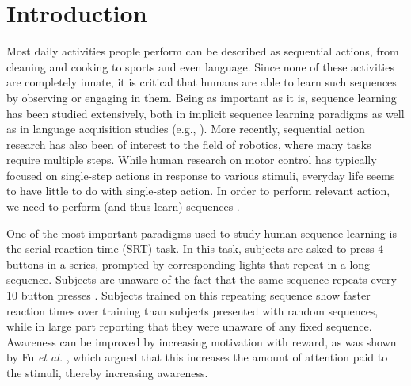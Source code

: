 \documentclass[conference]{IEEEtran}
\begin{document}

\section{Introduction}

Most daily activities people perform can be described as sequential actions, from cleaning and cooking to sports and even language. Since none of these activities are completely innate, it is critical that humans are able to learn such sequences by observing or engaging in them. Being as important as it is, sequence learning has been studied extensively, both in implicit sequence learning paradigms \cite{Nissen:1987,Cleeremans:1991,Stadler:1992,Boyer:2005} as well as in language acquisition studies (e.g., \cite{Saffran:1996}). More recently, sequential action research has also been of interest to the field of robotics, where many tasks require multiple steps. While human research on motor control has typically focused on single-step actions in response to various stimuli, everyday life seems to have little to do with single-step action. In order to perform relevant action, we need to perform (and thus learn) sequences \cite{deKleijn:2014}.

One of the most important paradigms used to study human sequence learning is the serial reaction time (SRT) task. In this task, subjects are asked to press 4 buttons in a series, prompted by corresponding lights that repeat in a long sequence. Subjects are unaware of the fact that the same sequence repeats every 10 button presses \cite{Nissen:1987}. Subjects trained on this repeating sequence show faster reaction times over training than subjects presented with random sequences, while in large part reporting that they were unaware of any fixed sequence. Awareness can be improved by increasing motivation with reward, as was shown by Fu \textit{et al.} \cite{Fu:2008}, which argued that this increases the amount of attention paid to the stimuli, thereby increasing awareness.
\end{document}
